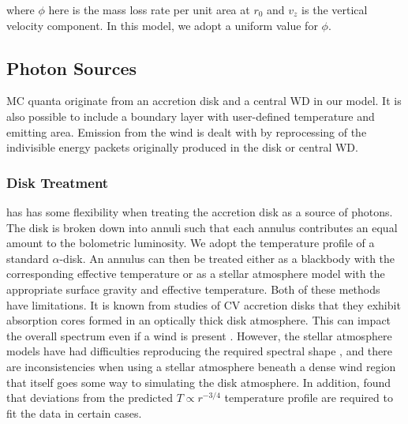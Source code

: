 \documentclass[preprint, a4paper, 11pt]{aastex}
\begin{document}
where $\phi$ here is the mass loss rate per unit area at $r_0$
and $v_z$ is the vertical velocity component. In this model, we
adopt a uniform value for $\phi$. 



\subsection{Photon Sources}

MC quanta originate from an accretion disk and a central WD in our model. It is also possible to include
a boundary layer with user-defined temperature and emitting area. Emission from the wind is dealt with
by reprocessing of the indivisible energy packets originally produced in the disk or central WD.

\subsubsection{Disk Treatment}

\py has has some flexibility when treating the accretion disk as a source of photons. 
The disk is broken down into annuli 
such that each annulus contributes an equal amount to the bolometric luminosity. 
We adopt the temperature profile of a standard \cite{shakurasunyaev1973} $\alpha$-disk.
An annulus can then
be treated either as a blackbody with the corresponding effective temperature or as a stellar atmosphere model
with the appropriate surface gravity and effective temperature. 
Both of these methods have limitations. It is known
from studies of CV accretion disks that they exhibit absorption cores 
formed in an optically thick disk atmosphere.
This can impact the overall spectrum even if a wind is present 
\citep[see e.g.][]{dhillon1996}.
However, the stellar atmosphere models
have had difficulties reproducing the required spectral shape \citep{wade1988}, 
and there are inconsistencies when using a 
stellar atmosphere beneath a dense
wind region that itself goes some way to simulating the disk atmosphere. 
In addition, \cite{linnell2010} found that deviations from the predicted 
$T\propto r^{-3/4}$ temperature profile are required to fit the data
in certain cases. 
\end{document}
